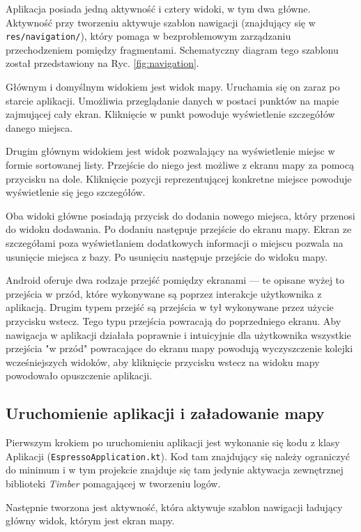 \documentclass[polish,polish,a4paper,12pt]{article}
\begin{document}
		Aplikacja posiada jedną aktywność i cztery widoki, w tym dwa główne. Aktywność przy tworzeniu aktywuje szablon nawigacji (znajdujący się w \texttt{res/navigation/}), który pomaga w bezproblemowym zarządzaniu przechodzeniem pomiędzy fragmentami. Schematyczny diagram tego szablonu został przedstawiony na Ryc. \ref{fig:navigation}.

		Głównym i domyślnym widokiem jest widok mapy. Uruchamia się on zaraz po starcie aplikacji. Umożliwia przeglądanie danych w postaci punktów na mapie zajmującej cały ekran. Kliknięcie w punkt powoduje wyświetlenie szczegółów danego miejsca.

		Drugim głównym widokiem jest widok pozwalający na wyświetlenie miejsc w formie sortowanej listy. Przejście do niego jest możliwe z ekranu mapy za pomocą przycisku na dole. Kliknięcie pozycji reprezentującej konkretne miejsce powoduje wyświetlenie się jego szczegółów.

		Oba widoki główne posiadają przycisk do dodania nowego miejsca, który przenosi do widoku dodawania. Po dodaniu następuje przejście do ekranu mapy. Ekran ze szczegółami poza wyświetlaniem dodatkowych informacji o miejscu pozwala na usunięcie miejsca z bazy. Po usunięciu następuje przejście do widoku mapy.

		Android oferuje dwa rodzaje przejść pomiędzy ekranami \cite{androiddevelopment} — te opisane wyżej to przejścia w przód, które wykonywane są poprzez interakcje użytkownika z aplikacją. Drugim typem przejść są przejścia w tył wykonywane przez użycie przycisku wstecz. Tego typu przejścia powracają do poprzedniego ekranu. Aby nawigacja w aplikacji działała poprawnie i intuicyjnie dla użytkownika wszystkie przejścia "w przód" powracające do ekranu mapy powodują wyczyszczenie kolejki wcześniejszych widoków, aby kliknięcie przycisku wstecz na widoku mapy powodowało opuszczenie aplikacji.

	\subsection{Uruchomienie aplikacji i załadowanie mapy}

	Pierwszym krokiem po uruchomieniu aplikacji jest wykonanie się kodu z klasy Aplikacji (\texttt{EspressoApplication.kt}). Kod tam znajdujący się należy ograniczyć do minimum \cite{kotlin} i w tym projekcie znajduje się tam jedynie aktywacja zewnętrznej biblioteki \textit{Timber} pomagającej w tworzeniu logów.

	Następnie tworzona jest aktywność, która aktywuje szablon nawigacji ładujący główny widok, którym jest ekran mapy.
\end{document}
